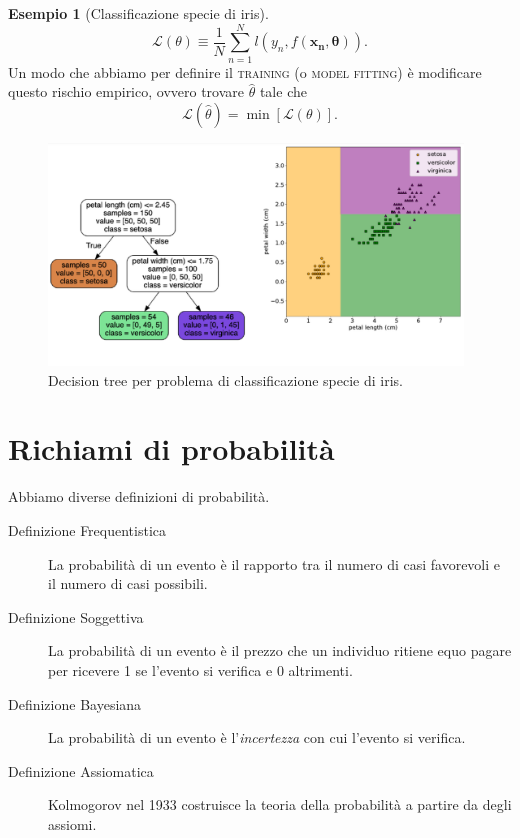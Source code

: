 \documentclass[10pt]{article}
\renewcommand{\vec}[1]{\boldsymbol{#1}}
\newcommand{\im}[1]{\textsc{#1}}
\theoremstyle{definition}
\newtheorem{example}{Esempio}[section]
\begin{document}
\begin{example}[Classificazione specie di iris]
\begin{equation}\label{eq:misclassification-rate}
\mathcal{L}(\theta) \equiv \frac{1}{N}\sum_{n=1}^N l\left( y_n, f(\vec{x_n}, \vec{\theta}) \right).
\end{equation}
Un modo che abbiamo per definire il \im{training} (o \im{model fitting}) è modificare questo rischio empirico, ovvero trovare $\hat{\theta}$ tale che
\begin{equation}
\mathcal{L}(\hat{\theta}) = \min[\mathcal{L}(\theta)].
\end{equation}

\begin{figure}
\includegraphics[width=0.98\textwidth]{Images/iris_decision_tree.PNG}
\caption{Decision tree per problema di classificazione specie di iris.}\label{fig:iris-decision-tree}
\end{figure}

\end{example}

\section{Richiami di probabilità}
Abbiamo diverse definizioni di probabilità.
\begin{description}
\item[Definizione Frequentistica] La probabilità di un evento è il rapporto tra il numero di casi favorevoli e il numero di casi possibili.
\item[Definizione Soggettiva] La probabilità di un evento è il prezzo che un individuo ritiene equo pagare per ricevere 1 se l'evento si verifica e 0 altrimenti.
\item[Definizione Bayesiana] La probabilità di un evento è l'\textit{incertezza} con cui l'evento si verifica.
\item[Definizione Assiomatica] Kolmogorov nel 1933 costruisce la teoria della probabilità a partire da degli assiomi.
\end{description}
\end{document}
